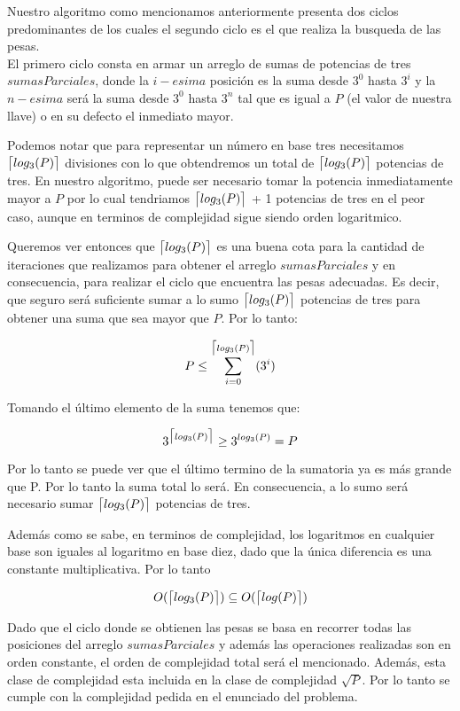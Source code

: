 
Nuestro algoritmo como mencionamos anteriormente presenta dos ciclos predominantes de los cuales el segundo ciclo es el que realiza la busqueda de las pesas.\\

El primero ciclo consta en armar un arreglo de sumas de potencias de tres $sumasParciales$, donde la $i-esima$ posición es la suma desde $3^0$ hasta $3^i$ y la $n-esima$ será la suma desde $3^0$ hasta $3^n$  tal que es igual a $P$ (el valor de nuestra llave) o en su defecto el inmediato mayor. 

Podemos notar que para representar un número en base tres necesitamos $\ceil[\big]{log_3(P)}$ divisiones con lo que obtendremos un total de $\ceil[\big]{log_3(P)}$  potencias de tres. 
En nuestro algoritmo, puede ser necesario tomar la potencia inmediatamente mayor a $P$ por lo cual tendriamos $\ceil[\big]{log_3(P)}$ + 1 potencias de tres en el peor caso, aunque en terminos de complejidad sigue siendo orden logaritmico. 

Queremos ver entonces que  $\ceil[\big]{log_3(P)}$ es una buena cota para la cantidad de iteraciones que realizamos para obtener el arreglo $sumasParciales$ y en consecuencia, para realizar el ciclo que encuentra las pesas adecuadas. Es decir, que seguro será suficiente sumar a lo sumo $\ceil[\big]{log_3(P)}$ potencias de tres para obtener una suma que sea mayor que $P$. Por lo tanto:

\begin{equation}
P \leq \sum_{i=0}^{\ceil[\big]{log_3(P)}}(3^i)
\end{equation}

Tomando el último elemento de la suma tenemos que:

\begin{equation}
3^{\ceil[\big]{log_3(P)}} \geq 3^{log_3(P)} = P
\end{equation}

Por lo tanto se puede ver que el último termino de la sumatoria ya es más grande que P. Por lo tanto la suma total lo será. En consecuencia, a lo sumo será necesario sumar $\ceil[\big]{log_3(P)}$ potencias de tres.

Además como se sabe, en terminos de complejidad, los logaritmos en cualquier base son iguales al logaritmo en base diez, dado que la única diferencia es una constante multiplicativa. Por lo tanto 


\begin{equation}
O(\ceil[\big]{log_3(P)}) \subseteq O(\ceil[\big]{log(P)})
\end{equation}

Dado que el ciclo donde se obtienen las pesas se basa en recorrer todas las posiciones del arreglo $sumasParciales$ y además las operaciones realizadas son en orden constante, el orden de complejidad total será el mencionado.
Además, esta clase de complejidad esta incluida en la clase de complejidad $\sqrt{P}$. Por lo tanto se cumple con la complejidad pedida en el enunciado del problema.
